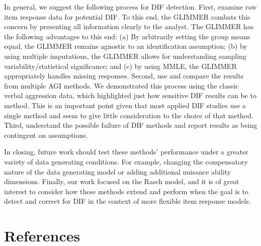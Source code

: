 \documentclass[
  english,
  man,floatsintext]{apa6}
\begin{document}
In general, we suggest the following process for DIF detection. First, examine raw item response data for potential DIF. To this end, the GLIMMER combats this concern by presenting all information clearly to the analyst. The GLIMMER has the following advantages to this end: (a) By arbitrarily setting the group means equal, the GLIMMER remains agnostic to an identification assumption; (b) by using multiple imputations, the GLIMMER allows for understanding sampling variability/statistical significance; and (c) by using MMLE, the GLIMMER appropriately handles missing responses. Second, use and compare the results from multiple AGI methods. We demonstrated this process using the classic verbal aggression data, which highlighted just how sensitive DIF results can be to method. This is an important point given that most applied DIF studies use a single method and seem to give little consideration to the choice of that method. Third, understand the possible failure of DIF methods and report results as being contingent on assumptions.

In closing, future work should test these methods' performance under a greater variety of data generating conditions. For example, changing the compensatory nature of the data generating model or adding additional nuisance ability dimensions. Finally, our work focused on the Rasch model, and it is of great interest to consider how these methods extend and perform when the goal is to detect and correct for DIF in the context of more flexible item response models.

\clearpage

\hypertarget{references}{%
\section{References}\label{references}}

\begingroup
\setlength{\parindent}{-0.5in}
\setlength{\leftskip}{0.5in}
\end{document}
